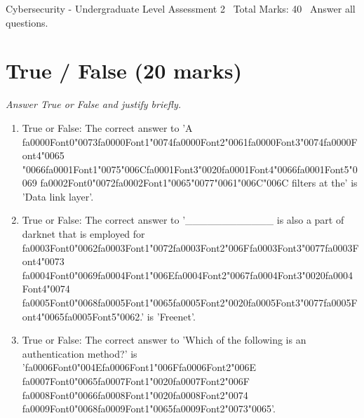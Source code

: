 \documentclass[12pt]{article}
\begin{document}
\begin{center}
Cybersecurity - Undergraduate Level Assessment 2 \
Total Marks: 40 \
Answer all questions.
\end{center}

\section*{True / False (20 marks)}
\textit{Answer True or False and justify briefly.}
\begin{enumerate}[label=\arabic*.]
\item True or False: The correct answer to 'A {\csname fa0000Font0\endcsname\char"0073}{\csname fa0000Font1\endcsname\char"0074}{\csname fa0000Font2\endcsname\char"0061}{\csname fa0000Font3\endcsname\char"0074}{\csname fa0000Font4\endcsname\char"0065} {\char"0066}{\csname fa0001Font1\endcsname\char"0075}{\char"006C}{\csname fa0001Font3\endcsname\char"0020}{\csname fa0001Font4\endcsname\char"0066}{\csname fa0001Font5\endcsname\char"0069} {\csname fa0002Font0\endcsname\char"0072}{\csname fa0002Font1\endcsname\char"0065}{\char"0077}{\char"0061}{\char"006C}{\char"006C} filters at the' is 'Data link layer'.
\item True or False: The correct answer to '\_\_\_\_\_\_\_\_\_\_\_\_ is also a part of darknet that is employed for {\csname fa0003Font0\endcsname\char"0062}{\csname fa0003Font1\endcsname\char"0072}{\csname fa0003Font2\endcsname\char"006F}{\csname fa0003Font3\endcsname\char"0077}{\csname fa0003Font4\endcsname\char"0073} {\csname fa0004Font0\endcsname\char"0069}{\csname fa0004Font1\endcsname\char"006E}{\csname fa0004Font2\endcsname\char"0067}{\csname fa0004Font3\endcsname\char"0020}{\csname fa0004Font4\endcsname\char"0074} {\csname fa0005Font0\endcsname\char"0068}{\csname fa0005Font1\endcsname\char"0065}{\csname fa0005Font2\endcsname\char"0020}{\csname fa0005Font3\endcsname\char"0077}{\csname fa0005Font4\endcsname\char"0065}{\csname fa0005Font5\endcsname\char"0062}.' is 'Freenet'.
\item True or False: The correct answer to 'Which of the following is an authentication method?' is '{\csname fa0006Font0\endcsname\char"004E}{\csname fa0006Font1\endcsname\char"006F}{\csname fa0006Font2\endcsname\char"006E} {\csname fa0007Font0\endcsname\char"0065}{\csname fa0007Font1\endcsname\char"0020}{\csname fa0007Font2\endcsname\char"006F} {\csname fa0008Font0\endcsname\char"0066}{\csname fa0008Font1\endcsname\char"0020}{\csname fa0008Font2\endcsname\char"0074} {\csname fa0009Font0\endcsname\char"0068}{\csname fa0009Font1\endcsname\char"0065}{\csname fa0009Font2\endcsname\char"0073}{\char"0065}'.

\end{enumerate}
\end{document}
